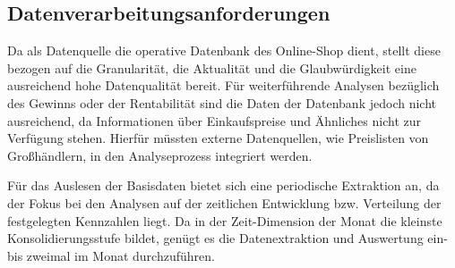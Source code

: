 \pagebreak

\subsection{Datenverarbeitungsanforderungen}

Da als Datenquelle die operative Datenbank des Online-Shop dient, stellt diese bezogen auf die Granularität, die Aktualität und die Glaubwürdigkeit eine ausreichend hohe Datenqualität bereit.
Für weiterführende Analysen bezüglich des Gewinns oder der Rentabilität sind die Daten der Datenbank jedoch nicht ausreichend, da Informationen über Einkaufspreise und Ähnliches nicht zur Verfügung stehen. Hierfür müssten externe Datenquellen, wie Preislisten von Großhändlern, in den Analyseprozess integriert werden.

Für das Auslesen der Basisdaten bietet sich eine periodische Extraktion an, da der Fokus bei den Analysen auf der zeitlichen Entwicklung bzw. Verteilung der festgelegten Kennzahlen liegt.
Da in der Zeit-Dimension der Monat die kleinste Konsolidierungsstufe bildet, genügt es die Datenextraktion und Auswertung ein- bis zweimal im Monat durchzuführen.
